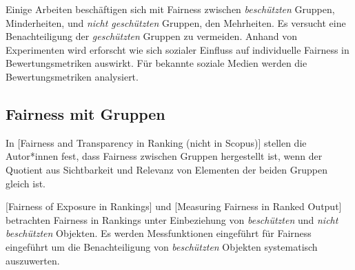 Einige Arbeiten beschäftigen sich mit Fairness zwischen \textit{beschützten} Gruppen, Minderheiten, und \textit{nicht geschützten} Gruppen, den Mehrheiten. Es versucht eine Benachteiligung der \textit{geschützten} Gruppen zu vermeiden. Anhand von Experimenten wird erforscht wie sich sozialer Einfluss auf individuelle Fairness in Bewertungsmetriken auswirkt. Für bekannte soziale Medien werden die Bewertungsmetriken analysiert.





\subsection{Fairness mit Gruppen}

In [Fairness and Transparency in Ranking (nicht in Scopus)] stellen die Autor*innen fest, dass Fairness zwischen Gruppen hergestellt ist, wenn der Quotient aus Sichtbarkeit und Relevanz von Elementen der beiden Gruppen gleich ist.

[Fairness of Exposure in Rankings] und [Measuring Fairness in Ranked Output] betrachten Fairness in Rankings unter Einbeziehung von \textit{beschützten} und \textit{nicht beschützten} Objekten. Es werden Messfunktionen eingeführt für Fairness eingeführt um die Benachteiligung von \textit{beschützten} Objekten systematisch auszuwerten.

